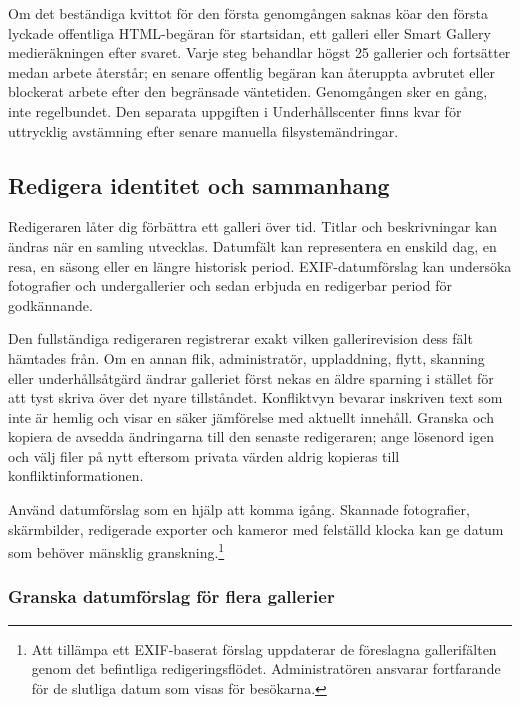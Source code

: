 \documentclass[11pt,a4paper]{article}
\begin{document}
Om det beständiga kvittot för den första genomgången saknas köar den första
lyckade offentliga HTML-begäran för startsidan, ett galleri eller Smart Gallery
medieräkningen efter svaret. Varje steg behandlar högst 25 gallerier och
fortsätter medan arbete återstår; en senare offentlig begäran kan återuppta
avbrutet eller blockerat arbete efter den begränsade väntetiden. Genomgången
sker en gång, inte regelbundet. Den separata uppgiften i Underhållscenter finns
kvar för uttrycklig avstämning efter senare manuella filsystemändringar.

\subsection{Redigera identitet och sammanhang}

Redigeraren låter dig förbättra ett galleri över tid. Titlar och beskrivningar
kan ändras när en samling utvecklas. Datumfält kan representera en enskild dag,
en resa, en säsong eller en längre historisk period. EXIF-datumförslag kan
undersöka fotografier och undergallerier och sedan erbjuda en redigerbar period
för godkännande.

Den fullständiga redigeraren registrerar exakt vilken gallerirevision dess fält
hämtades från. Om en annan flik, administratör, uppladdning, flytt, skanning
eller underhållsåtgärd ändrar galleriet först nekas en äldre sparning i stället
för att tyst skriva över det nyare tillståndet. Konfliktvyn bevarar inskriven
text som inte är hemlig och visar en säker jämförelse med aktuellt innehåll.
Granska och kopiera de avsedda ändringarna till den senaste redigeraren; ange
lösenord igen och välj filer på nytt eftersom privata värden aldrig kopieras
till konfliktinformationen.

Använd datumförslag som en hjälp att komma igång. Skannade fotografier,
skärmbilder, redigerade exporter och kameror med felställd klocka kan ge datum
som behöver mänsklig granskning.\footnote{Att tillämpa ett EXIF-baserat förslag
uppdaterar de föreslagna gallerifälten genom det befintliga redigeringsflödet.
Administratören ansvarar fortfarande för de slutliga datum som visas för
besökarna.}

\subsubsection{Granska datumförslag för flera gallerier}
\end{document}
